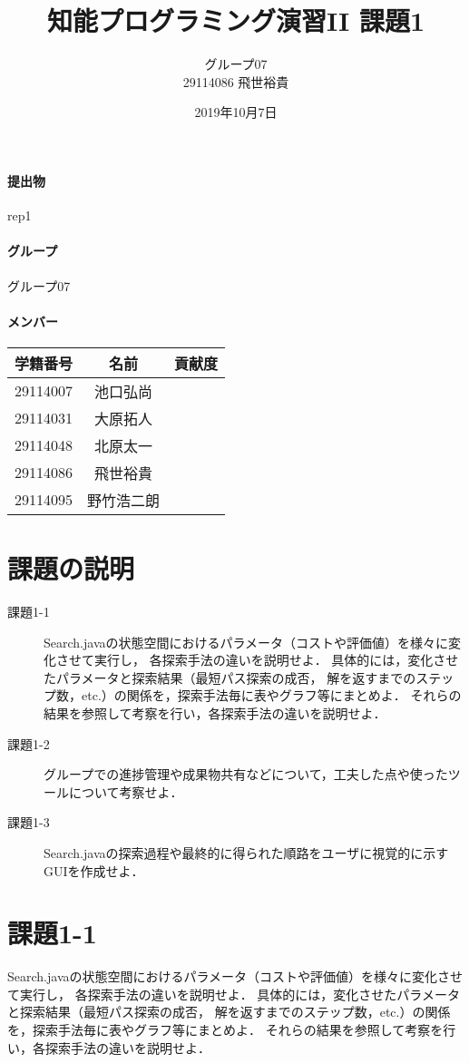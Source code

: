 \documentclass[a4j]{jarticle}
\title{知能プログラミング演習II 課題1}
\author{グループ07\\
  29114086 飛世裕貴\\
}
\date{2019年10月7日}
\begin{document}
\maketitle

\paragraph{提出物} rep1
\paragraph{グループ} グループ07
\paragraph{メンバー}
\begin{tabular}{|c|c|c|}
  \hline\hline
  学籍番号&名前&貢献度\\
  \hline\hline
  29114007&池口弘尚&\\
  \hline
  29114031&大原拓人&\\
  \hline
  29114048&北原太一&\\
  \hline
  29114086&飛世裕貴&\\
  \hline
  29114095&野竹浩二朗&\\
  \hline
\end{tabular}



\section{課題の説明}
\begin{description}
\item[課題1-1] Search.javaの状態空間におけるパラメータ（コストや評価値）を様々に変化させて実行し，
  各探索手法の違いを説明せよ．
  具体的には，変化させたパラメータと探索結果（最短パス探索の成否，
  解を返すまでのステップ数，etc.）の関係を，探索手法毎に表やグラフ等にまとめよ．
  それらの結果を参照して考察を行い，各探索手法の違いを説明せよ．
\item[課題1-2] グループでの進捗管理や成果物共有などについて，工夫した点や使ったツールについて考察せよ．
\item[課題1-3] Search.javaの探索過程や最終的に得られた順路をユーザに視覚的に示すGUIを作成せよ．
\end{description}

\section{課題1-1}
\begin{screen}
  Search.javaの状態空間におけるパラメータ（コストや評価値）を様々に変化させて実行し，
  各探索手法の違いを説明せよ．
  具体的には，変化させたパラメータと探索結果（最短パス探索の成否，
  解を返すまでのステップ数，etc.）の関係を，探索手法毎に表やグラフ等にまとめよ．
  それらの結果を参照して考察を行い，各探索手法の違いを説明せよ．
\end{screen}
\end{document}
